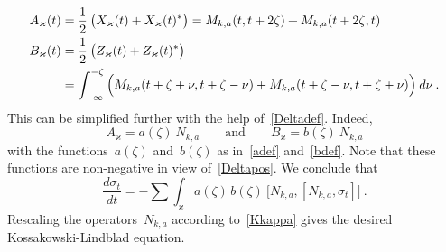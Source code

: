 \documentclass[reqno,11pt]{amsart}
\numberwithin{equation}{section}
\newcommand{\1}{\mathds{1}}
\newcommand{\sint}{\sum  \!\!\!\!\!\!\! \int }
\begin{document}
{\begin{align*}
A_\varkappa(t) &= \frac{1}{2} \:\big( X_\varkappa(t) + X_\varkappa(t)^* \big)
= M_{k,a}(t, t+2 \zeta) + M_{k,a}(t+2 \zeta, t) \\ %
B_\varkappa(t) &= \frac{1}{2} \:\big( Z_\varkappa(t) + Z_\varkappa(t)^* \big) \notag \\
&=\int_{-\infty}^{-\zeta} \Big( M_{k,a}(t+\zeta+\nu, t+\zeta-\nu)
+ M_{k,a}(t+\zeta-\nu, t+\zeta+\nu) \Big) \:d\nu \:. %
\end{align*}
This can be simplified further with the help of~\eqref{Deltadef}. Indeed,
\[ A_\varkappa = a(\zeta)\: N_{k,a} \qquad \text{and} \qquad
B_\varkappa = b(\zeta)\: N_{k,a} \]
with the functions~$a(\zeta)$ and~$b(\zeta)$ as in~\eqref{adef} and~\eqref{bdef}.
Note that these functions are non-negative in view of~\eqref{Deltapos}.
We conclude that
\[ \frac{d \sigma_t}{dt} = -\sint_\varkappa a(\zeta)\, b(\zeta)\:
\big[ N_{k,a}, [N_{k,a}, \sigma_t] \big] \:. \]
Rescaling the operators~$N_{k,a}$ according to~\eqref{Kkappa} gives
the desired Kossakowski-Lindblad equation.

}
\end{document}
